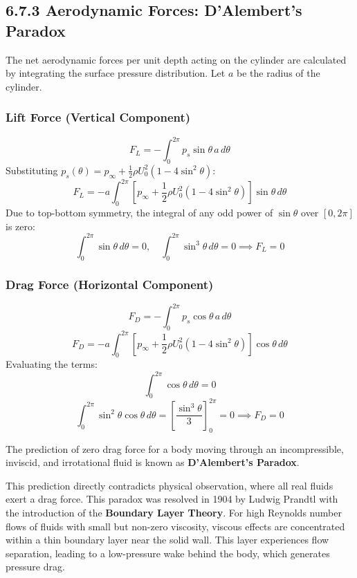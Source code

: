 \subsection{6.7.3 Aerodynamic Forces: D'Alembert's Paradox}

The net aerodynamic forces per unit depth acting on the cylinder are calculated by integrating the surface pressure distribution. Let $a$ be the radius of the cylinder.

\subsubsection{Lift Force (Vertical Component)}
$$F_L = -\int_{0}^{2\pi} p_s \sin\theta \, a \, d\theta$$
Substituting $p_s(\theta) = p_\infty + \frac{1}{2}\rho U_0^2(1 - 4\sin^2\theta)$:
$$F_L = -a \int_{0}^{2\pi} \left[ p_\infty + \frac{1}{2}\rho U_0^2(1 - 4\sin^2\theta) \right] \sin\theta \, d\theta$$
Due to top-bottom symmetry, the integral of any odd power of $\sin\theta$ over $[0, 2\pi]$ is zero:
$$\int_{0}^{2\pi} \sin\theta \, d\theta = 0, \quad \int_{0}^{2\pi} \sin^3\theta \, d\theta = 0 \implies F_L = 0$$

\subsubsection{Drag Force (Horizontal Component)}
$$F_D = -\int_{0}^{2\pi} p_s \cos\theta \, a \, d\theta$$
$$F_D = -a \int_{0}^{2\pi} \left[ p_\infty + \frac{1}{2}\rho U_0^2(1 - 4\sin^2\theta) \right] \cos\theta \, d\theta$$
Evaluating the terms:
$$\int_{0}^{2\pi} \cos\theta \, d\theta = 0$$
$$\int_{0}^{2\pi} \sin^2\theta \cos\theta \, d\theta = \left[ \frac{\sin^3\theta}{3} \right]_{0}^{2\pi} = 0 \implies F_D = 0$$

\begin{notebox}
The prediction of zero drag force for a body moving through an incompressible, inviscid, and irrotational fluid is known as \textbf{D'Alembert's Paradox}.

This prediction directly contradicts physical observation, where all real fluids exert a drag force. This paradox was resolved in 1904 by Ludwig Prandtl with the introduction of the \textbf{Boundary Layer Theory}. For high Reynolds number flows of fluids with small but non-zero viscosity, viscous effects are concentrated within a thin boundary layer near the solid wall. This layer experiences flow separation, leading to a low-pressure wake behind the body, which generates pressure drag.
\end{notebox}

